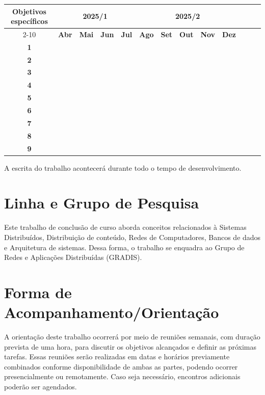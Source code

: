 \documentclass[11pt]{article}
\begin{document}
\vspace{0.5cm}
{
    \noindent \begin{tabular}{|c|c|c|c|c|c|c|c|c|c|c|c|c|}
    \hline
    \multirow{2}{*}{\textbf{\small{Objetivos específicos}}} & \multicolumn{4}{|c|}{\textbf{\small{2025/1}}} &
    \multicolumn{5}{|c|}{\textbf{\small{2025/2}}} \\
    \cline{2-10}
    &\textbf{Abr} & \textbf{Mai} & \textbf{Jun} & \textbf{Jul} & \textbf{Ago} & \textbf{Set} & 
    \textbf{Out} & \textbf{Nov} & \textbf{Dez} \\
    \hline
    \textbf{\small{1}} & \cellcolor{gray} & & & & & & & & \\
    \hline
    \textbf{\small{2}} & & \cellcolor{gray} & & & & & & & \\
    \hline
    \textbf{\small{3}} & & & \cellcolor{gray} & \cellcolor{gray} & & & & & \\
    \hline
    \textbf{\small{4}} & & & \cellcolor{gray} & \cellcolor{gray} & & & & & \\
    \hline
    \textbf{\small{5}} & & & \cellcolor{gray} & \cellcolor{gray} & & & & & \\
    \hline
    \textbf{\small{6}} & & & & & \cellcolor{gray} & & & & \\
    \hline
    \textbf{\small{7}} & & & & & & \cellcolor{gray} & & & \\
    \hline
    \textbf{\small{8}} & & & & & & & \cellcolor{gray} & \cellcolor{gray} & \\
    \hline
    \textbf{\small{9}} & & & & & & & & & \cellcolor{gray} \\
    \hline
    
    \end{tabular}
}

\vspace{0.5cm}

A escrita do trabalho acontecerá durante todo o tempo de desenvolvimento.
		
\section{Linha e Grupo de Pesquisa} \label{sec:LinhaGrupoPesquisa}
    Este trabalho de conclusão de curso aborda conceitos relacionados à Sistemas Distribuídos, Distribuição de conteúdo, Redes de Computadores, Bancos de dados e Arquitetura de sistemas. Dessa forma, o trabalho se enquadra ao Grupo de Redes e Aplicações Distribuídas (GRADIS).

\section{Forma de Acompanhamento/Orientação} \label{sec:Acompanhamento}
A orientação deste trabalho ocorrerá por meio de reuniões semanais, com duração prevista de uma hora, para discutir os objetivos alcançados e definir as próximas tarefas. Essas reuniões serão realizadas em datas e horários previamente combinados conforme disponibilidade de ambas as partes, podendo ocorrer presencialmente ou remotamente. Caso seja necessário, encontros adicionais poderão ser agendados.
\end{document}
